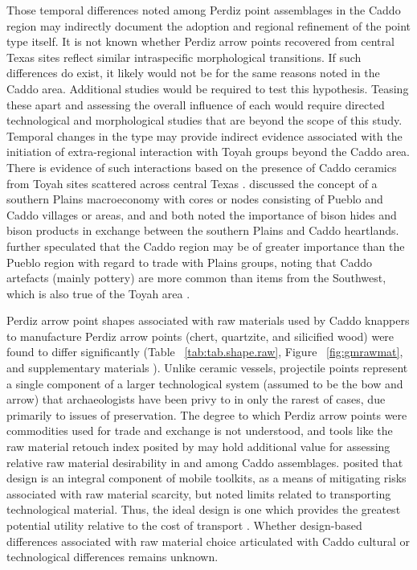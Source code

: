 \documentclass[review]{elsarticle}
\begin{document}
Those temporal differences noted among Perdiz point assemblages in the Caddo region may indirectly document the adoption and regional refinement of the point type itself. It is not known whether Perdiz arrow points recovered from central Texas sites reflect similar intraspecific morphological transitions. If such differences do exist, it likely would not be for the same reasons noted in the Caddo area. Additional studies would be required to test this hypothesis.
Teasing these apart and assessing the overall influence of each would require directed technological and morphological studies that are beyond the scope of this study. Temporal changes in the type may provide indirect evidence associated with the initiation of extra-regional interaction with Toyah groups beyond the Caddo area. There is evidence of such interactions based on the presence of Caddo ceramics from Toyah sites scattered across central Texas \citep{RN9001}. \citet{RN6910} discussed the concept of a southern Plains macroeconomy with cores or nodes consisting of Pueblo and Caddo villages or areas, and \citet{RN6046} and \citet{RN6910} both noted the importance of bison hides and bison products in exchange between the southern Plains and Caddo heartlands. \citet{RN6910} further speculated that the Caddo region may be of greater importance than the Pueblo region with regard to trade with Plains groups, noting that Caddo artefacts (mainly pottery) are more common than items from the Southwest, which is also true of the Toyah area \citep{RN8999}.

Perdiz arrow point shapes associated with raw materials used by Caddo knappers to manufacture Perdiz arrow points (chert, quartzite, and silicified wood) were found to differ significantly (Table ~\ref{tab:tab.shape.raw}, Figure ~\ref{fig:gmrawmat}, and supplementary materials \citealp{RN8980}). Unlike ceramic vessels, projectile points represent a single component of a larger technological system (assumed to be the bow and arrow) that archaeologists have been privy to in only the rarest of cases, due primarily to issues of preservation. The degree to which Perdiz arrow points were commodities used for trade and exchange is not understood, and tools like the raw material retouch index posited by \citet{RN6541} may hold additional value for assessing relative raw material desirability in and among Caddo assemblages. \citet{RN6363} posited that design is an integral component of mobile toolkits, as a means of mitigating risks associated with raw material scarcity, but noted limits related to transporting technological material. Thus, the ideal design is one which provides the greatest potential utility relative to the cost of transport \citep{RN6363}. Whether design-based differences associated with raw material choice articulated with Caddo cultural or technological differences remains unknown.
\end{document}

